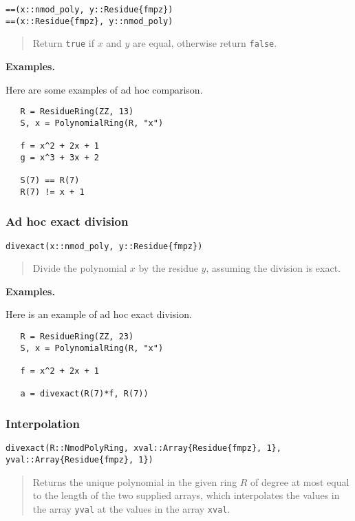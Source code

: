 \documentclass[a4paper,10pt]{article}
\newcommand{\code}{\lstinline}
\newcommand{\desc}[1]{\vspace{-3mm}\begin{quote}#1\end{quote}}
\begin{document}
{{\begin{lstlisting}
==(x::nmod_poly, y::Residue{fmpz})
==(x::Residue{fmpz}, y::nmod_poly)
\end{lstlisting}

\desc{Return \code{true} if $x$ and $y$ are equal, otherwise return \code{false}.}

\textbf{Examples.}

Here are some examples of ad hoc comparison.

\begin{lstlisting}
   R = ResidueRing(ZZ, 13)
   S, x = PolynomialRing(R, "x")

   f = x^2 + 2x + 1
   g = x^3 + 3x + 2

   S(7) == R(7)
   R(7) != x + 1
\end{lstlisting}

\subsubsection{Ad hoc exact division}

\begin{lstlisting}
divexact(x::nmod_poly, y::Residue{fmpz})
\end{lstlisting}

\desc{Divide the polynomial $x$ by the residue $y$, assuming the division is exact.}

\textbf{Examples.}

Here is an example of ad hoc exact division.

\begin{lstlisting}
   R = ResidueRing(ZZ, 23)
   S, x = PolynomialRing(R, "x")

   f = x^2 + 2x + 1
   
   a = divexact(R(7)*f, R(7)) 
\end{lstlisting}

\subsubsection{Interpolation}

\begin{lstlisting}
divexact(R::NmodPolyRing, xval::Array{Residue{fmpz}, 1}, yval::Array{Residue{fmpz}, 1})
\end{lstlisting}

\desc{Returns the unique polynomial in the given ring $R$ of degree at most equal to the
length of the two supplied arrays, which interpolates the values in the array \code{yval}
at the values in the array \code{xval}.}

}}
\end{document}
